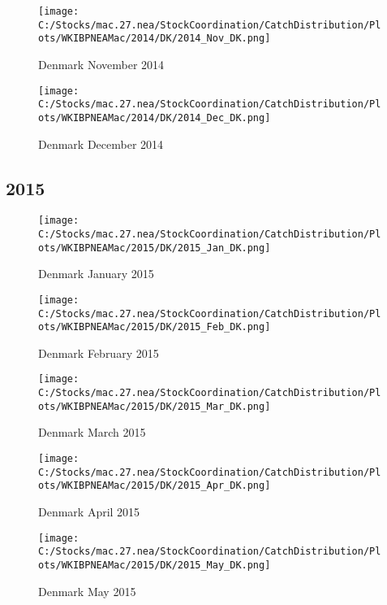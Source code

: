 \documentclass{article}
\begin{document}
\begin{figure}
	\centering
		\texttt{[image: C:/Stocks/mac.27.nea/StockCoordination/CatchDistribution/Plots/WKIBPNEAMac/2014/DK/2014\_Nov\_DK.png]}
	\caption{Denmark November 2014}
	\label{fig:2014_Nov_DK}
\end{figure}

\begin{figure}
	\centering
		\texttt{[image: C:/Stocks/mac.27.nea/StockCoordination/CatchDistribution/Plots/WKIBPNEAMac/2014/DK/2014\_Dec\_DK.png]}
	\caption{Denmark December 2014}
	\label{fig:2014_Dec_DK}
\end{figure}

\clearpage

\newpage

\subsection{2015}



\begin{figure}[h]
	\centering
		\texttt{[image: C:/Stocks/mac.27.nea/StockCoordination/CatchDistribution/Plots/WKIBPNEAMac/2015/DK/2015\_Jan\_DK.png]}
	\caption{Denmark January 2015}
	\label{fig:2015_Jan_DK}
\end{figure}

\begin{figure}
	\centering
		\texttt{[image: C:/Stocks/mac.27.nea/StockCoordination/CatchDistribution/Plots/WKIBPNEAMac/2015/DK/2015\_Feb\_DK.png]}
	\caption{Denmark February 2015}
	\label{fig:2015_Feb_DK}
\end{figure}

\begin{figure}
	\centering
		\texttt{[image: C:/Stocks/mac.27.nea/StockCoordination/CatchDistribution/Plots/WKIBPNEAMac/2015/DK/2015\_Mar\_DK.png]}
	\caption{Denmark March 2015}
	\label{fig:2015_Mar_DK}
\end{figure}

\begin{figure}
	\centering
		\texttt{[image: C:/Stocks/mac.27.nea/StockCoordination/CatchDistribution/Plots/WKIBPNEAMac/2015/DK/2015\_Apr\_DK.png]}
	\caption{Denmark April 2015}
	\label{fig:2015_Apr_DK}
\end{figure}

\begin{figure}
	\centering
		\texttt{[image: C:/Stocks/mac.27.nea/StockCoordination/CatchDistribution/Plots/WKIBPNEAMac/2015/DK/2015\_May\_DK.png]}
	\caption{Denmark May 2015}
	\label{fig:2015_May_DK}
\end{figure}
\end{document}
